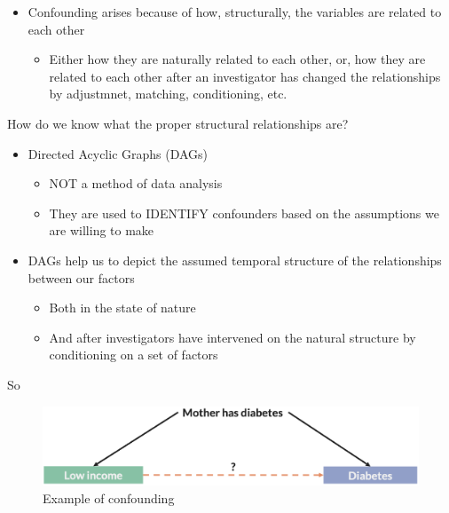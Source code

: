 \documentclass[
]{book}
\providecommand{\tightlist}{%
  \setlength{\itemsep}{0pt}\setlength{\parskip}{0pt}}
\begin{document}
\begin{itemize}
\tightlist
\item
  Confounding arises because of how, structurally, the variables are related to each other

  \begin{itemize}
  \tightlist
  \item
    Either how they are naturally related to each other, or, how they are related to each other after an investigator has changed the relationships by adjustmnet, matching, conditioning, etc.
  \end{itemize}
\end{itemize}

How do we know what the proper structural relationships are?

\begin{itemize}
\tightlist
\item
  Directed Acyclic Graphs (DAGs)

  \begin{itemize}
  \tightlist
  \item
    NOT a method of data analysis
  \item
    They are used to IDENTIFY confounders based on the assumptions we are willing to make
  \end{itemize}
\item
  DAGs help us to depict the assumed temporal structure of the relationships between our factors

  \begin{itemize}
  \tightlist
  \item
    Both in the state of nature
  \item
    And after investigators have intervened on the natural structure by conditioning on a set of factors
  \end{itemize}
\end{itemize}

So

\begin{figure}

{\centering \includegraphics[width=1\linewidth]{img/confounding/confounding_example} 

}

\caption{Example of confounding}\label{fig:unnamed-chunk-12}
\end{figure}
\end{document}
